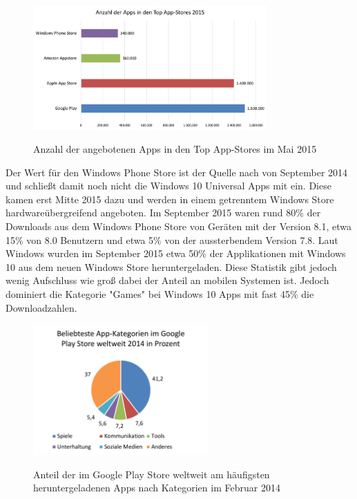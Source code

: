 \begin{figure}[htbp]
	\centering
	\includegraphics[width=0.8\textwidth]{Bilder/Anzahl_der_Apps}
	\caption{Anzahl der angebotenen Apps in den Top App-Stores im Mai 2015}\label{graph_apps_in_stores}\citep{apps_in_stores}
\end{figure}

Der Wert für den Windows Phone Store ist der Quelle nach von September 2014 und schließt damit noch nicht die Windows 10 Universal Apps mit ein. Diese kamen erst Mitte 2015 dazu und werden in einem getrenntem Windows Store hardwareübergreifend angeboten. Im September 2015 waren rund 80\% der Downloads aus dem Windows Phone Store von Geräten mit der Version 8.1, etwa 15\% von 8.0 Benutzern und etwa 5\% von der aussterbendem Version 7.8.
Laut Windows wurden im September 2015 etwa 50\% der Applikationen mit Windows 10 aus dem neuen Windows Store heruntergeladen. Diese Statistik gibt jedoch wenig Aufschluss wie groß dabei der Anteil an mobilen Systemen ist. Jedoch dominiert die Kategorie "Games" bei Windows 10 Apps mit fast 45\% die Downloadzahlen.\citep{windows_store_trends_2015}

\begin{figure}[htbp]
	\centering
	\includegraphics[width=0.6\textwidth]{Bilder/Google_Play_Store_Kategorien}
	\caption{Anteil der im Google Play Store weltweit am häufigsten heruntergeladenen Apps nach Kategorien im Februar 2014}\label{graph_play_store_kategorien}\citep{play_store_categories}
\end{figure}

